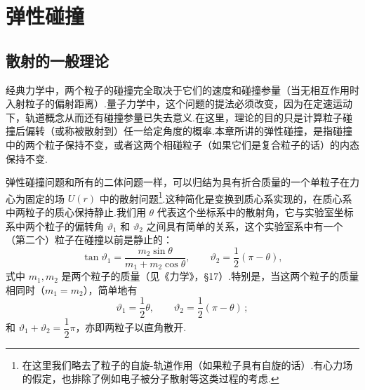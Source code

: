 \chapter{弹性碰撞}

\section{散射的一般理论}

经典力学中，两个粒子的碰撞完全取决于它们的速度和碰撞参量（当无相互作用时入射粒子的偏射距离）.量子力学中，这个问题的提法必须改变，因为在定速运动下，轨道概念从而还有碰撞参量已失去意义.在这里，理论的目的只是计算粒子碰撞后偏转（或称被散射到）任一给定角度的概率.本章所讲的弹性碰撞，是指碰撞中的两个粒子保持不变，或者这两个相碰粒子（如果它们是复合粒子的话）的内态保持不变.

弹性碰撞问题和所有的二体问题一样，可以归结为具有折合质量的一个单粒子在力心为固定的场 $U(r)$ 中的散射问题\footnote{在这里我们略去了粒子的自旋-轨道作用（如果粒子具有自旋的话）.有心力场的假定，也排除了例如电子被分子散射等这类过程的考虑.}.这种简化是变换到质心系实现的，在质心系中两粒子的质心保持静止.我们用 $\theta$ 代表这个坐标系中的散射角，它与实验室坐标系中两个粒子的偏转角 $\vartheta_1$ 和 $\vartheta_2$ 之间具有简单的关系，这个实验室系中有一个（第二个）粒子在碰撞以前是静止的：
\begin{equation}
  \tan\vartheta_1=\frac{m_2\sin\theta}{m_1+m_2\cos\theta},\qquad
  \vartheta_2=\frac{1}{2}(\pi-\theta),
\end{equation}
式中 $m_1,m_2$ 是两个粒子的质量（见《力学》，§17）.特别是，当这两个粒子的质量相同时（$m_1=m_2$），简单地有
\begin{equation}
  \vartheta_1=\frac{1}{2}\theta,\qquad
  \vartheta_2=\frac{1}{2}(\pi-\theta)\,;
\end{equation}
和 $\vartheta_1+\vartheta_2=\dfrac{1}{2}\pi$，亦即两粒子以直角散开.

